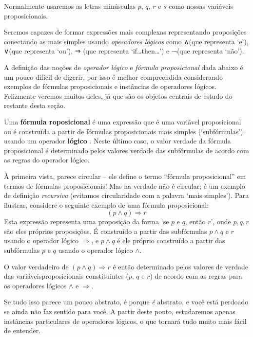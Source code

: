 Normalmente usaremos as letras minúsculas $p$, $q$, $r$ e $s$ como nossas variáveis ​​proposicionais.

Seremos capazes de formar expressões mais complexas representando proposições conectando as mais simples usando \textit{operadores lógicos} como ∧\wedge (que representa `e'), ∨\vee (que representa `ou'), ⇒ \Rightarrow (que representa `if\dots{}then\dots{}') e ¬\neg (que representa `não').

A definição das noções de \textit{operador lógico} e \textit{fórmula proposicional} dada abaixo é um pouco difícil de digerir, por isso é melhor compreendida considerando exemplos de fórmulas proposicionais e instâncias de operadores lógicos. Felizmente veremos muitos deles, já que são os objetos centrais de estudo do restante desta seção.

\begin{definition}
\label{defPropositionalFormula}
\label{defLogicalOperator}
Uma \textbf{fórmula roposicional} é uma expressão que é uma variável proposicional ou é construída a partir de fórmulas proposicionais mais simples (`subfórmulas') usando um operador \textbf{\mbox{lógico} \mbox{}}. Neste último caso, o valor verdade da fórmula proposicional é determinado pelos valores verdade das subfórmulas de acordo com as regras do operador lógico.
\end{definition}

À primeira vista,  parece circular – ele define o termo “fórmula proposicional” em termos de fórmulas proposicionais! Mas na verdade não é circular; é um exemplo de definição \textit{recursiva} (evitamos circularidade com a palavra `mais simples'). Para ilustrar, considere o seguinte exemplo de uma fórmula proposicional:
\[
(p \wedge q) \Rightarrow r
\]
Esta expressão representa uma proposição da forma `se $p$ e $q$, então $r$', onde $p,q,r$ são eles próprios proposições. É construído a partir das subfórmulas $p \wedge q$ e $r$ usando o operador lógico $\Rightarrow$, e $p \wedge q$ é ele próprio construído a partir das subfórmulas $p$ e $q$ usando o operador lógico $\wedge$.

O valor verdadeiro de $(p \wedge q) \Rightarrow r$ é então determinado pelos valores de verdade das variáveis ​​proposicionais constituintes ($p$, $q$ e $r$) de acordo com as regras para os operadores lógicos $\wedge$ e $\Rightarrow$.

Se tudo isso parece um pouco abstrato, é porque \textit{é} abstrato, e você está perdoado se ainda não faz sentido para você. A partir deste ponto, estudaremos apenas instâncias particulares de operadores lógicos, o que tornará tudo muito mais fácil de entender.

